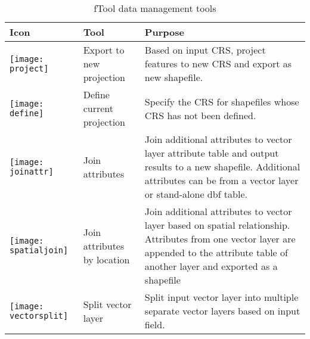 \begin{table}[ht]
\centering
\caption{fTool data management tools}\label{tab:fTool_data_management}\medskip
 \begin{tabular}{|p{0.3in}|p{1.2in}|p{4.7in}|}
 \hline \textbf{Icon} & \textbf{Tool} & \textbf{Purpose} \\
 \hline \texttt{[image: project]} & Export to new projection & Based on input CRS, project features to new CRS and export as new shapefile. \\
 \hline \texttt{[image: define]} & Define current  projection & Specify the CRS for shapefiles whose CRS has not been defined. \\
 \hline \texttt{[image: joinattr]} & Join attributes & Join additional attributes to vector layer attribute table and output results to a new shapefile. Additional attributes can be from a vector layer or stand-alone dbf table. \\
 \hline \texttt{[image: spatialjoin]} & Join attributes by location & Join additional attributes to vector layer based on spatial relationship. Attributes from one vector layer are appended to the attribute table of another layer and exported as a shapefile \\
 \hline \texttt{[image: vectorsplit]} & Split vector layer & Split input vector layer into multiple separate vector layers based on input field. \\
 \hline
\end{tabular}
\end{table}



